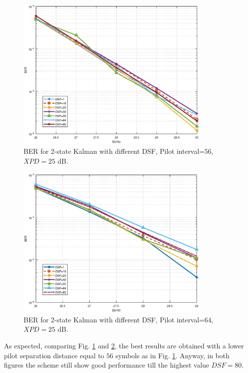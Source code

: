 \begin{figure}
	\includegraphics[width=0.85\textwidth]{figures/fig_red_kalman/Fig9.eps}
	\caption{BER for 2-state Kalman with different DSF, Pilot interval=$56$, $XPD=25$ dB.}
	\label{fig9}      
\end{figure}	
\begin{figure}
	\includegraphics[width=0.85\textwidth]{figures/fig_red_kalman/Fig10.eps}
	\caption{BER for 2-state Kalman with different DSF, Pilot interval=$64$, $XPD=25$ dB.}
	\label{fig10}      
\end{figure}

As expected, comparing Fig. \ref{fig9} and \ref{fig10}, the best results are obtained with a lower pilot separation distance equal to $56$ symbols as in Fig. \ref{fig9}. Anyway, in both figures the scheme still show good performance till the highest value $DSF=80$.

